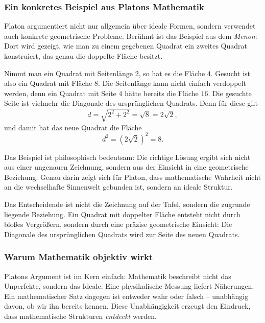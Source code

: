 \subsubsection*{Ein konkretes Beispiel aus Platons Mathematik}

Platon argumentiert nicht nur allgemein über ideale Formen,
sondern verwendet auch konkrete geometrische Probleme.
Berühmt ist das Beispiel aus dem \emph{Menon}:
Dort wird gezeigt,
wie man zu einem gegebenen Quadrat ein zweites Quadrat konstruiert,
das genau die doppelte Fläche besitzt.

Nimmt man ein Quadrat mit Seitenlänge \(2\),
so hat es die Fläche \(4\).
Gesucht ist also ein Quadrat mit Fläche \(8\).
Die Seitenlänge kann nicht einfach verdoppelt werden,
denn ein Quadrat mit Seite \(4\) hätte bereits die Fläche \(16\).
Die gesuchte Seite ist vielmehr die Diagonale des ursprünglichen Quadrats.
Denn für diese gilt
\[
d = \sqrt{2^2+2^2} = \sqrt{8} = 2\sqrt{2},
\]
und damit hat das neue Quadrat die Fläche
\[
d^2 = (2\sqrt{2})^2 = 8.
\]

Das Beispiel ist philosophisch bedeutsam:
Die richtige Lösung ergibt sich nicht aus einer ungenauen Zeichnung,
sondern aus der Einsicht in eine geometrische Beziehung.
Genau darin zeigt sich für Platon,
dass mathematische Wahrheit nicht an die wechselhafte Sinnenwelt gebunden ist,
sondern an ideale Struktur.

\begin{DidacticBox}
	\label{box:platon-quadrat}
	\small
	Das Entscheidende ist nicht die Zeichnung auf der Tafel,
	sondern die zugrunde liegende Beziehung.
	Ein Quadrat mit doppelter Fläche entsteht nicht durch bloßes Vergrößern,
	sondern durch eine präzise geometrische Einsicht:
	Die Diagonale des ursprünglichen Quadrats wird zur Seite des neuen Quadrats.
\end{DidacticBox}

\subsubsection*{Warum Mathematik objektiv wirkt}

Platons Argument ist im Kern einfach:
Mathematik beschreibt nicht das Unperfekte,
sondern das Ideale.
Eine physikalische Messung liefert Näherungen.
Ein mathematischer Satz dagegen ist entweder wahr oder falsch --
unabhängig davon,
ob wir ihn bereits kennen.
Diese Unabhängigkeit erzeugt den Eindruck,
dass mathematische Strukturen \emph{entdeckt} werden.

